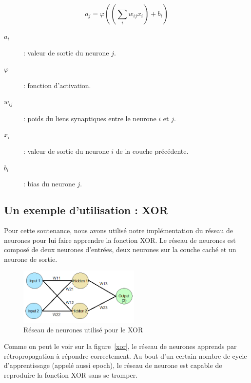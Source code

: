 \documentclass[11pt]{report}
\begin{document}
\[ a_{j} = \varphi \left( \left( \sum_{i} w_{ij} x_{i} \right) + b_{i} \right) \]

\begin{description}
\item[$a_{i}$] : valeur de sortie du neurone $j$.
\item[$\varphi$] : fonction d'activation.
\item[$w_{ij}$] : poids du liens synaptiques entre le neurone $i$ et $j$.
\item[$x_{i}$] : valeur de sortie du neurone $i$ de la couche précédente.
\item[$b_{i}$] : bias du neurone $j$.
\end{description}

\subsection{Un exemple d'utilisation : XOR}

Pour cette soutenance, nous avons utilisé notre implémentation du réseau de neurones pour lui faire apprendre la fonction XOR. Le réseau de neurones est composé de deux neurones d'entrées, deux neurones sur la couche caché et un neurone de sortie.

\begin{figure}[htbp]
\centering
\includegraphics[width=6cm]{xor_neuron.jpg}
\caption{Réseau de neurones utilisé pour le XOR}
\end{figure}

Comme on peut le voir sur la figure~\ref{xor}, le réseau de neurones apprends par rétropropagation à répondre correctement. Au bout d'un certain nombre de cycle d'apprentissage (appelé aussi epoch), le réseau de neurone est capable de reproduire la fonction XOR sans se tromper.
\end{document}
